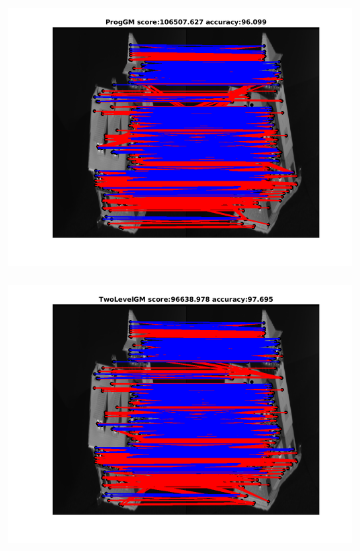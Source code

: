 \documentclass[
	fontsize=12pt,
	paper=a4,
	twoside=false,
	numbers=noenddot,
	plainheadsepline,
	toc=listof,
	toc=bibliography
]{scrartcl}
\begin{document}
\begin{figure}[h] 
	\begin{subfigure}[b]{0.3\textwidth}
		\centering
		\includegraphics[scale=0.25]{"fig_ver2608/RealImages/HouseSeq/no_descr/using_cpd_afftrafo/ext_solution/fi_1_ProgGM"}  
	\end{subfigure}%
	\begin{subfigure}[b]{0.3\textwidth}
		\centering
		\includegraphics[scale=0.25]{"fig_ver2608/RealImages/HouseSeq/no_descr/using_cpd_afftrafo/ext_solution/fi_1_TwoLevelGM"}  
	\end{subfigure} 
	\begin{subfigure}[b]{0.3\textwidth}
		\centering

\end{subfigure}
\end{figure}
\end{document}
